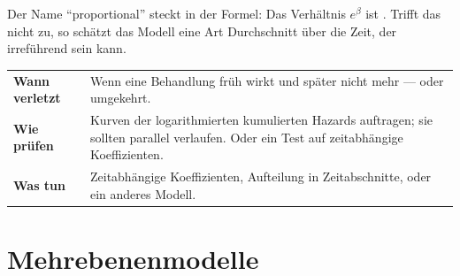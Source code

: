 \begin{warnung}
Der Name \enquote{proportional} steckt in der Formel: Das Verhältnis $e^\beta$ ist . Trifft das nicht zu, so schätzt das Modell eine Art Durchschnitt über die Zeit, der irreführend sein kann.

\begin{center}
\renewcommand{\arraystretch}{1.5}
\begin{tabular}{@{}P{2.6cm}P{6.0cm}@{}}
\toprule
\textbf{Wann verletzt} & Wenn eine Behandlung früh wirkt und später nicht mehr --- oder umgekehrt.\\
\textbf{Wie prüfen} & Kurven der logarithmierten kumulierten Hazards auftragen; sie sollten parallel verlaufen. Oder ein Test auf zeitabhängige Koeffizienten.\\
\textbf{Was tun} & Zeitabhängige Koeffizienten, Aufteilung in Zeitabschnitte, oder ein anderes Modell.\\
\bottomrule
\end{tabular}
\end{center}

\begin{center}
\begin{minipage}{0.88\textwidth}
\end{minipage}
\end{center}
\end{warnung}

\section{Mehrebenenmodelle}

